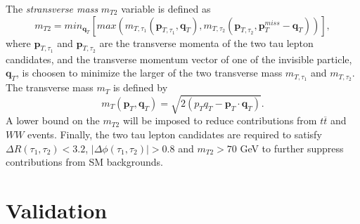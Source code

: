 \documentclass{ws-mpla}
\begin{document}
The \textit{stransverse mass} $m_{T2}$ variable is defined as
\begin{equation}
m_{T2} =min_{\mathbf{q}_T}
\left[
max(m_{T,\tau_1}(\mathbf{p}_{T,\tau_1},\mathbf{q}_T),m_{T,\tau_2}(\mathbf{p}_{T,\tau_2},\mathbf{p}^{miss}_T -\mathbf{q}_T))
\right],
\end{equation}   
where $\mathbf{p}_{T,\tau_1}$ and $\mathbf{p}_{T,\tau_2}$ are the transverse momenta of the two tau lepton candidates, and the transverse momentum vector of one of the invisible particle, $\mathbf{q}_T$, is choosen to minimize the larger of the two transverse mass $m_{T,\tau_1}$ and $m_{T,\tau_2}$. The transverse mass $m_T$ is defined by
\begin{equation}
m_{T}(\mathbf{p}_T,\mathbf{q}_T) = \sqrt{2(p_T q_T -\mathbf{p}_T\cdot\mathbf{q}_T)}.
\end{equation} 
A lower bound on the $m_{T2}$ will be imposed to reduce contributions from $t\overline{t}$ and $WW$ events.
Finally, the two tau lepton candidates are required to satisfy $\Delta R(\tau_1,\tau_2) < 3.2$, $|\Delta\phi (\tau_1,\tau_2)| > 0.8$ and $m_{T2} > 70$ GeV to further suppress contributions from SM backgrounds.




\section{Validation}
\end{document}
